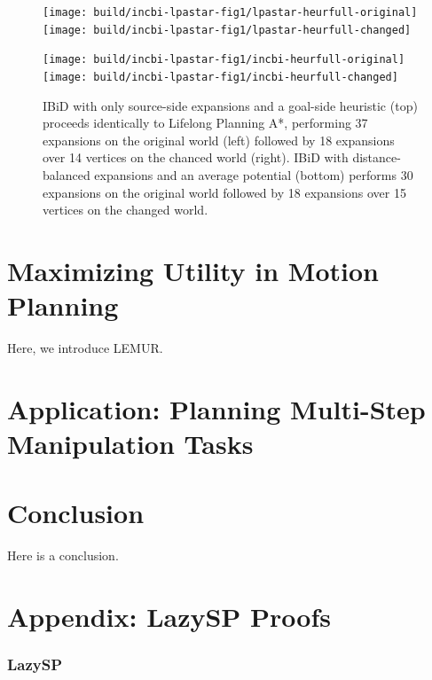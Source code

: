 \documentclass[nobib]{tufte-book}
\begin{document}
\begin{figure}
   \centering%
   
   \texttt{[image: build/incbi-lpastar-fig1/lpastar-heurfull-original]}%
   \;\;%
   \texttt{[image: build/incbi-lpastar-fig1/lpastar-heurfull-changed]}%
   
   \vspace{0.2cm}
   
   \texttt{[image: build/incbi-lpastar-fig1/incbi-heurfull-original]}%
   \;\;%
   \texttt{[image: build/incbi-lpastar-fig1/incbi-heurfull-changed]}%
   
   \caption{IBiD with only source-side expansions and a goal-side
      heuristic (top) proceeds identically to Lifelong Planning A*,
      performing 37 expansions on the original world (left)
      followed by 18 expansions over 14 vertices on the chanced
      world (right).
      IBiD with distance-balanced expansions and an average
      potential (bottom)
      performs 30 expansions on the original world
      followed by 18 expansions over 15 vertices on the changed
      world.}
   \label{fig:incbi-lpastar-fig1}
\end{figure}

\chapter{Maximizing Utility in Motion Planning}
\label{chap:lemur}

Here, we introduce LEMUR.


\chapter{Application: Planning Multi-Step Manipulation Tasks}
\label{chap:family}


\chapter{Conclusion}

Here is a conclusion.


\appendix

\chapter{Appendix: LazySP Proofs}
\label{sec:appendix-proofs}

\subsection{LazySP}
\end{document}
